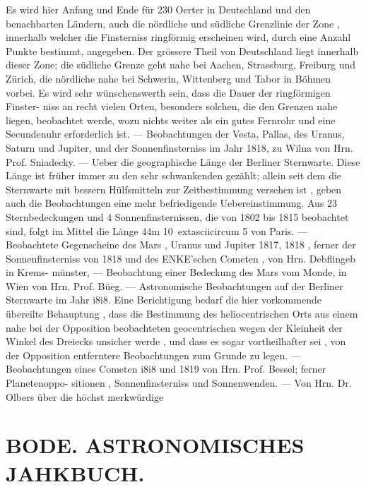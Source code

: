 \documentclass[12pt,a4paper]{article}
\begin{document}
{{{{{{{{Es  wird  hier  Anfang  und  Ende  für  230 Oerter  in  Deutschland  und  den  benachbarten  Ländern,  auch  die  nördliche  und  südliche  Grenzlinie  der Zone ,  innerhalb  welcher  die  Finsterniss  ringförmig  erscheinen  wird,  durch  eine  Anzahl  Punkte  bestimmt, angegeben.  Der  grössere  Theil  von  Deutschland  liegt  innerhalb  dieser  Zone;  die  südliche  Grenze  geht nahe  bei  Aachen,  Strassburg,  Freiburg  und  Zürich,  die  nördliche  nahe  bei  Schwerin,  Wittenberg  und Tabor  in  Böhmen  vorbei.  Es  wird  sehr  wünschenswerth  sein,  dass  die  Dauer  der  ringförmigen  Finster- niss an  recht  vielen  Orten,  besonders  solchen,  die  den  Grenzen  nahe  liegen,  beobachtet  werde,  wozu nichts  weiter  als  ein  gutes  Fernrohr  und  eine  Secundenuhr  erforderlich  ist.  ---  Beobachtungen  der  Vesta, Pallas,  des  Uranus,  Saturn  und  Jupiter,  und  der  Sonnenfinsterniss  im  Jahr  1818,  zu  Wilna  von  Hrn. Prof.  Sniadecky.  ---  Ueber  die  geographische  Länge  der  Berliner  Sternwarte.  Diese  Länge  ist  früher immer  zu  den  sehr  schwankenden  gezählt;  allein  seit  dem  die  Sternwarte  mit  bessern  Hülfsmitteln  zur Zeitbestimmung  versehen  ist ,  geben  auch  die  Beobachtungen  eine  mehr  befriedigende  Uebereinstimmung. Aus  23  Sternbedeckungen  und  4  Sonnenfinsternissen,  die  von  1802  bis  1815  beobachtet  sind,  folgt  im Mittel  die  Länge  44m  10\	extasciicircum{}{ }5  von  Paris.  ---  Beobachtete  Gegenscheine  des  Mars ,  Uranus  und  Jupiter  1817, 1818 ,  ferner  der  Sonnenfinsterniss  von  1818  und  des  ENKE'schen  Cometen ,  von  Hrn.  Debflingeb  in  Krems- münster, ---  Beobachtung  einer  Bedeckung  des  Mars  vom  Monde,  in  Wien  von  Hrn.  Prof.  Büeg.  --- Astronomische  Beobachtungen  auf  der  Berliner  Sternwarte  im  Jahr  i8i8.  Eine  Berichtigung  bedarf  die hier  vorkommende  übereilte  Behauptung ,  dass  die  Bestimmung  des  heliocentrischen  Orts  aus  einem  nahe bei  der  Opposition  beobachteten  geocentrischen  wegen  der  Kleinheit  der  Winkel  des  Dreiecks  unsicher werde ,  und  dass  es  sogar  vortheilhafter  sei ,  von  der  Opposition  entferntere  Beobachtungen  zum  Grunde zu  legen.  ---  Beobachtungen  eines  Cometen  i8i8  und  1819  von  Hrn.  Prof.  Bessel;  ferner  Planetenoppo- sitionen ,  Sonnenfinsterniss  und  Sonnenwenden.  ---      Von  Hrn.  Dr.  Olbers   über  die  höchst  merkwürdige


\section*{BODE.      ASTRONOMISCHES  JAHKBUCH.}

}}}}}}}}
\end{document}
